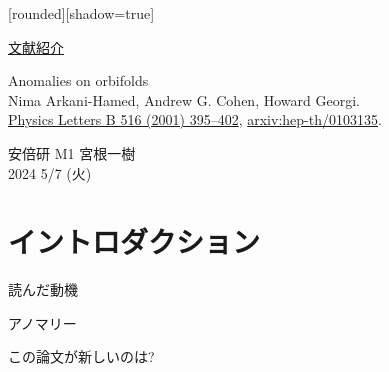 \documentclass[
  unicode,a4paper,10pt,
  xcolor = {dvipsnames,svgnames},
  hyperref ={colorlinks=true,citecolor=Navy,linkcolor=NavyBlue,urlcolor=purple},
  ja=standard,lualatex
]{beamer}
\begin{document}
\begin{frame}

  [rounded][shadow=true]

  \begin{center}
    \uline{文献紹介}
  \end{center}
  \begin{block}{}
    \vspace*{5pt}

    \centering\Large
    Anomalies on orbifolds
    \\
    \normalsize
    Nima Arkani-Hamed, Andrew G. Cohen, Howard Georgi.
    \\
    \small
    \href{https://doi.org/10.1016/S0370-2693(01)00946-7}{Physics Letters B 516 (2001) 395–402},
    \href{
      https://doi.org/10.48550/arXiv.hep-th/0103135
      }{arxiv:hep-th/0103135}.
    
    \vspace*{5pt}
  \end{block}

  \begin{center}
    安倍研 M1 宮根一樹\\
    2024 5/7 (火)
  \end{center}
\end{frame}


\section{イントロダクション}

\begin{frame}
  \huge \secname
\end{frame}


\begin{frame}{読んだ動機}





\end{frame}


\begin{frame}{アノマリー}



\end{frame}


\begin{frame}{この論文が新しいのは?}



\end{frame}
\end{document}
